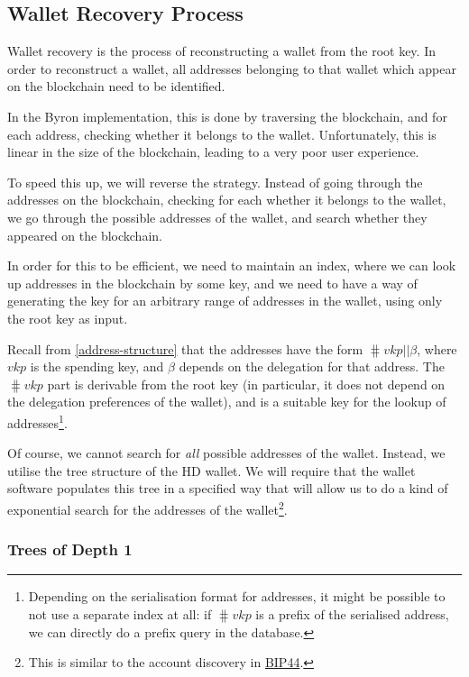 \documentclass[11pt,a4paper]{article}
\begin{document}
\subsection{Wallet Recovery Process}
\label{wallet-recovery-process}

Wallet recovery is the process of reconstructing a wallet from the root
key. In order to reconstruct a wallet, all addresses belonging to that
wallet which appear on the blockchain need to be identified.

In the Byron implementation, this is done by traversing the
blockchain, and for each address, checking whether it belongs to the
wallet. Unfortunately, this is linear in the size of the blockchain,
leading to a very poor user experience.

To speed this up, we will reverse the strategy. Instead of going through
the addresses on the blockchain, checking for each whether it belongs to
the wallet, we go through the possible addresses of the wallet, and
search whether they appeared on the blockchain.

In order for this to be efficient, we need to maintain an index, where
we can look up addresses in the blockchain by some key, and we need to
have a way of generating the key for an arbitrary range of addresses in
the wallet, using only the root key as input.

Recall from \cref{address-structure} that the addresses have the form
\(\hash{vkp} \mathbin{||} \beta\), where \(vkp\) is the spending key, and
\(\beta\) depends on the delegation for that address. The
\(\hash{vkp}\) part is derivable from the root key (in
particular, it does not depend on the delegation preferences of the
wallet), and is a suitable key for the lookup of addresses\footnote{Depending
  on the serialisation format for addresses, it might be possible to not
  use a separate index at all: if \(\hash{vkp}\) is a prefix of
  the serialised address, we can directly do a prefix query in the
  database.}.

Of course, we cannot search for \emph{all} possible addresses of the
wallet. Instead, we utilise the tree structure of the HD wallet. We will
require that the wallet software populates this tree in a specified way
that will allow us to do a kind of exponential search for the addresses
of the wallet\footnote{This is similar to the account discovery
  in \href{https://github.com/bitcoin/bips/blob/master/bip-0044.mediawiki}{BIP44}.}.

\subsubsection{Trees of Depth 1}
\label{trees-of-depth-1}
\end{document}
